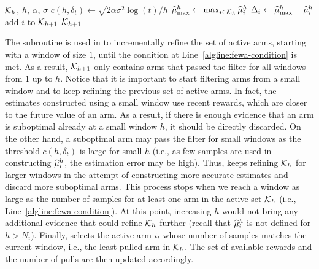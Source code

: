 \begin{algorithm}[t]
\caption{{\FILTER}}
\label{alg:filter}
\begin{algorithmic}[1]
\Require $\mathcal{K}_{h}$, $h$, $\alpha$, $\sigma$
\State $c(h, \delta_t) \leftarrow \sqrt{2\alpha\sigma^2\log{(t)}/h }$
\State $\widehat{\mu}^h_{\max}  \leftarrow \max_{i \in \mathcal{K}_{h}}\widehat{\mu}_i^h$\label{algline:filter-max}
	\State $\Delta_i \leftarrow  \widehat{\mu}^h_{\max} - \widehat{\mu}^h_{i} $ \label{algline:filter-delta}
	\State add $i$ to $\mathcal{K}_{h+1}$ \label{algline:filter-add}
	\EndIf
\EndFor
\Ensure $\mathcal{K}_{h+1}$
\end{algorithmic}
\end{algorithm}



The \FILTER subroutine is used in \FEWA to incrementally refine the set of active arms, starting with a window of size $1$, until the condition at Line~\ref{algline:fewa-condition} is met. As a result, $\mathcal{K}_{h+1}$ only contains arms that passed the filter for all windows from $1$ up to $h$. Notice that it is important to start filtering arms from a small window and to keep refining the previous set of active arms. 
In fact, the estimates constructed using a small window use recent rewards, which are closer to the future value of an arm. As a result, if there is enough evidence that an arm is suboptimal already at a small window $h$, it should be directly discarded. On the other hand, a suboptimal arm may pass the filter for small windows as the threshold $c(h , \delta_t)$ is large for small $h$ (i.e., as few samples are used in constructing $\widehat{\mu}_i^h$, the estimation error may be high). Thus, \FEWA keeps refining $\mathcal{K}_{h}$ for larger windows in the attempt of constructing more accurate estimates and discard more suboptimal arms. This process stops when we reach a window as large as the number of samples for at least one arm in the active set $\mathcal{K}_{h}$ (i.e., Line~\ref{algline:fewa-condition}). At this point, increasing $h$ would not bring any additional evidence that could refine $\mathcal{K}_{h}$ further (recall that $\widehat{\mu}^h_i$ is not defined for $h > N_i$). Finally,  \FEWA selects the active arm $i_t$ whose number of samples matches the current window, i.e., the least pulled arm in $\mathcal{K}_{h}$. The set of available rewards and the number of pulls are then updated accordingly. 

